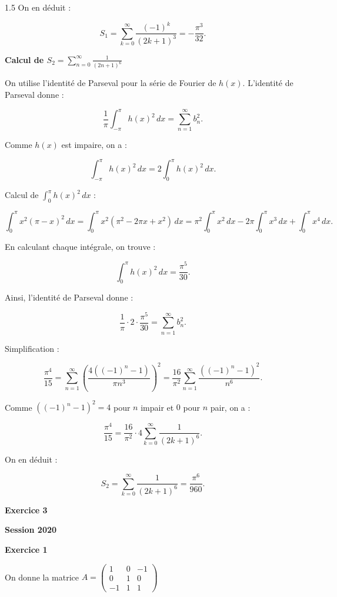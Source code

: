 \documentclass[12pt]{article}
\begin{document}
\begin{spacing}{1.5}
On en déduit :

\[
S_1 = \sum_{k=0}^\infty \frac{(-1)^k}{(2k+1)^3} = -\frac{\pi^3}{32}.
\]

\textbf{Calcul de \( S_2 = \sum_{n=0}^\infty \frac{1}{(2n+1)^6} \)}

On utilise l'identité de Parseval pour la série de Fourier de \( h(x) \). L'identité de Parseval donne :

\[
\frac{1}{\pi} \int_{-\pi}^\pi h(x)^2 \, dx = \sum_{n=1}^\infty b_n^2.
\]

Comme \( h(x) \) est impaire, on a :

\[
\int_{-\pi}^\pi h(x)^2 \, dx = 2 \int_0^\pi h(x)^2 \, dx.
\]

Calcul de \( \int_0^\pi h(x)^2 \, dx \) :

\[
\int_0^\pi x^2 (\pi - x)^2 \, dx = \int_0^\pi x^2 (\pi^2 - 2\pi x + x^2) \, dx = \pi^2 \int_0^\pi x^2 \, dx - 2\pi \int_0^\pi x^3 \, dx + \int_0^\pi x^4 \, dx.
\]

En calculant chaque intégrale, on trouve :

\[
\int_0^\pi h(x)^2 \, dx = \frac{\pi^5}{30}.
\]

Ainsi, l'identité de Parseval donne :

\[
\frac{1}{\pi} \cdot 2 \cdot \frac{\pi^5}{30} = \sum_{n=1}^\infty b_n^2.
\]

Simplification :

\[
\frac{\pi^4}{15} = \sum_{n=1}^\infty \left( \frac{4((-1)^n - 1)}{\pi n^3} \right)^2 = \frac{16}{\pi^2} \sum_{n=1}^\infty \frac{((-1)^n - 1)^2}{n^6}.
\]

Comme \( ((-1)^n - 1)^2 = 4 \) pour \( n \) impair et \( 0 \) pour \( n \) pair, on a :

\[
\frac{\pi^4}{15} = \frac{16}{\pi^2} \cdot 4 \sum_{k=0}^\infty \frac{1}{(2k+1)^6}.
\]

On en déduit :

\[
S_2 = \sum_{k=0}^\infty \frac{1}{(2k+1)^6} = \frac{\pi^6}{960}.
\]






\medskip\textbf{Exercice 3}


\medskip
\textbf{Session 2020}

\medskip\textbf{Exercice 1}

On donne la matrice $ A= \begin{pmatrix}
1 & 0 & -1\\
0 & 1 & 0\\
-1 & 1 & 1
\end{pmatrix}$                                                                   


\end{spacing}
\end{document}
